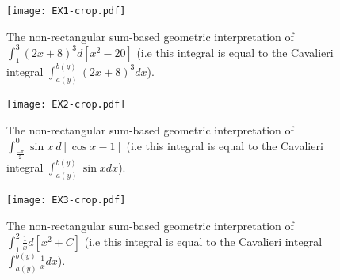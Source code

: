 \documentclass{article}
\theoremstyle{theorem}
\theoremstyle{definition}
\begin{document}
 \begin{figure}[htb]
 \centering
 \texttt{[image: EX1-crop.pdf]}
 \caption{The non-rectangular sum-based geometric interpretation of $\int_{1}^3 (2x+8)^3 d[x^2-20]$ (i.e this integral is equal to the 
 Cavalieri integral $\int_{a(y)}^{b(y)} (2x+8)^3 dx$).}
 \label{fig:ex1_sec}
 \end{figure}

\begin{figure}[htb]
\centering
\texttt{[image: EX2-crop.pdf]}
\caption{The non-rectangular sum-based geometric interpretation of $\int_{\frac{-\pi}{2}}^0 \sin{x}~d[\cos{x}-1]$ (i.e this integral is equal to the 
 Cavalieri integral $\int_{a(y)}^{b(y)} \sin{x} dx$).}
\label{fig:ex2_sec}
\end{figure}

\begin{figure}[htb]
\centering
\texttt{[image: EX3-crop.pdf]}
\caption{The non-rectangular sum-based geometric interpretation of $\int_1^2 \frac{1}{x} d[x^2+C]$ (i.e this integral is equal to the 
 Cavalieri integral $\int_{a(y)}^{b(y)} \frac{1}{x} dx$).}
\label{fig:ex3_sec}
\end{figure}
\end{document}
